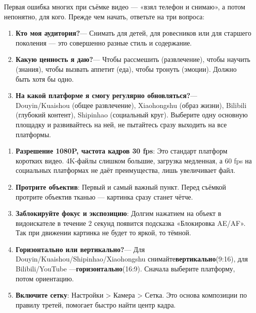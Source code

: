 


Первая ошибка многих при съёмке видео — «взял телефон и снимаю», а потом непонятно, для кого. Прежде чем начать, ответьте на три вопроса:

\begin{enumerate}
  \item \textbf{Кто моя аудитория?}— Снимать для детей, для ровесников или для старшего поколения — это совершенно разные стиль и содержание.
  \item \textbf{Какую ценность я даю?}— Чтобы рассмешить (развлечение), чтобы научить (знания), чтобы вызвать аппетит (еда), чтобы тронуть (эмоции). Должно быть хотя бы одно.
  \item \textbf{На какой платформе я смогу регулярно обновляться?}— Douyin/Kuaishou (общее развлечение), Xiaohongshu (образ жизни), Bilibili (глубокий контент), Shipinhao (социальный круг). Выберите одну основную площадку и развивайтесь на ней, не пытайтесь сразу выходить на все платформы.
\end{enumerate}


\begin{enumerate}
  \item \textbf{Разрешение 1080P, частота кадров 30 fps}: Это стандарт платформ коротких видео. 4K-файлы слишком большие, загрузка медленная, а 60 fps на социальных платформах не даёт преимущества, лишь увеличивает файл.
  \item \textbf{Протрите объектив}: Первый и самый важный пункт. Перед съёмкой протрите объектив тканью — картинка сразу станет чётче.
  \item \textbf{Заблокируйте фокус и экспозицию}: Долгим нажатием на объект в видоискателе в течение 2 секунд появится подсказка «Блокировка AE/AF». Так при движении картинка не будет то яркой, то тёмной.
  \item \textbf{Горизонтально или вертикально?}— Для Douyin/Kuaishou/Shipinhao/Xiaohongshu снимайте\textbf{вертикально}(9:16), для Bilibili/YouTube —\textbf{горизонтально}(16:9). Сначала выберите платформу, потом ориентацию.
  \item \textbf{Включите сетку}: Настройки > Камера > Сетка. Это основа композиции по правилу третей, помогает быстро найти центр кадра.
\end{enumerate}

